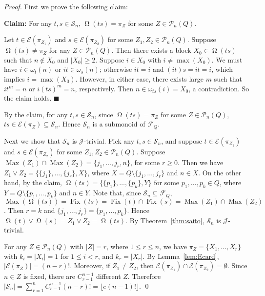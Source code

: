 \documentclass{llncs}
\renewcommand{\le}{\leqslant}
\renewcommand{\ge}{\geqslant}
\newcommand{\cE}{{\mathcal E}}
\newcommand{\cF}{{\mathcal F}}
\newcommand{\cP}{{\mathcal P}}
\newcommand{\cS}{{\mathcal S}}
\newcommand{\gJ}{{\mathcal J}}
\newcommand{\join}{{\mathbin{\vee}}}
\newcommand{\qedb}{\hfill$\blacksquare$}
\DeclareMathOperator{\Fix}{Fix}
\DeclareMathOperator{\Orbit}{\Omega}
\DeclareMathOperator{\Max}{Max}
\begin{document}
\begin{proof}
First we prove the following claim: 

\medskip

{\bf Claim:} For any $t, s \in \cS_n$, $\Orbit(ts) = \pi_Z$ for some $Z \in \cP_n(Q)$. 

Let $t \in \cE(\pi_{Z_1})$ and $s \in \cE(\pi_{Z_2})$ for some $Z_1, Z_2 \in \cP_n(Q)$. Suppose $\Orbit(ts) \neq \pi_Z$ for any $Z \in \cP_n(Q)$. Then there exists a block $X_0 \in \Orbit(ts)$ such that $n \not\in X_0$ and $|X_0| \ge 2$. Suppose $i \in X_0$ with $i \neq \max(X_0)$. We must have $i \in \omega_t(n)$ or $it \in \omega_s(n)$; otherwise $it = i$ and $(it)s = it = i$, which implies $i = \max(X_0)$. However, in either case, there exists large $m$ such that $it^m = n$ or $i(ts)^m = n$, respectively. Then $n \in \omega_{ts}(i) = X_0$, a contradiction. So the claim holds. \qedb 

\medskip

By the claim, for any $t, s \in \cS_n$, since $\Orbit(ts) = \pi_Z$ for some $Z \in \cP_n(Q)$, $ts \in \cE(\pi_Z) \subseteq \cS_n$. Hence $\cS_n$ is a submonoid of $\cF_Q$. 

Next we show that $\cS_n$ is $\gJ$-trivial. Pick any $t, s \in \cS_n$, and suppose $t \in \cE(\pi_{Z_1})$ and $s \in \cE(\pi_{Z_2})$ for some $Z_1, Z_2 \in \cP_n(Q)$. Suppose $\Max(Z_1) \cap \Max(Z_2) = \{j_1,\ldots,j_r,n\}$, for some $r \ge 0$. Then we have $Z_1 \join Z_2 = \{\{j_1\}, \ldots, \{j_r\}, X\}$, where $X = Q \setminus \{j_1,\ldots,j_r\}$ and $n \in X$. On the other hand, by the claim, $\Orbit(ts) = \{\{p_1\}, \ldots, \{p_k\}, Y\}$ for some $p_1,\ldots,p_k \in Q$, where $Y = Q \setminus \{p_1,\ldots,p_k\}$ and $n \in Y$. Note that, since $\cS_n \subseteq \cF_Q$, $\Max(\Orbit(ts)) = \Fix(ts) = \Fix(t) \cap \Fix(s) = \Max(Z_1) \cap \Max(Z_2)$. Then $r = k$ and $\{j_1,\ldots,j_r\} = \{p_1,\ldots,p_k\}$. Hence $\Orbit(t) \join \Orbit(s) = Z_1 \join Z_2 = \Orbit(ts)$. By Theorem~\ref{thm:saito}, $\cS_n$ is $\gJ$-trivial. 

For any $Z \in \cP_n(Q)$ with $|Z| = r$, where $1 \le r \le n$, we have $\pi_Z = \{X_1,\ldots,X_r\}$ with $k_i = |X_i| = 1$ for $1 \le i < r$, and $k_r = |X_r|$. By Lemma~\ref{lem:Ecard}, $|\cE(\pi_Z)| = (n-r)!$. Moreover, if $Z_1 \neq Z_2$, then $\cE(\pi_{Z_1}) \cap \cE(\pi_{Z_2}) = \emptyset$. Since $n \in Z$ is fixed, there are $C^{n-1}_{r-1}$ different $Z$. Therefore $|\cS_n| = \sum_{r=1}^n C^{n-1}_{r-1} (n-r)! = \lfloor e(n-1)! \rfloor$. \qed
\end{proof}
\end{document}
